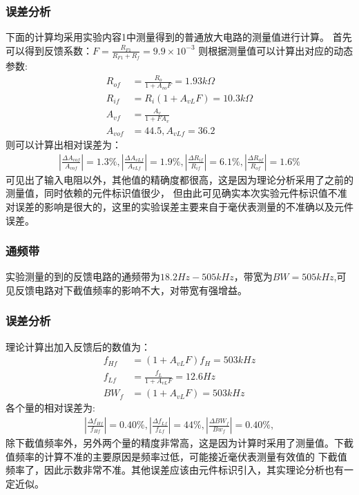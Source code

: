 \documentclass[a4paper,11pt,UTF8]{ctexart}
\begin{document}
  \subsubsection{误差分析}
  下面的计算均采用实验内容1中测量得到的普通放大电路的测量值进行计算。
  首先可以得到反馈系数：$F=\frac{R_{F1}}{R_{F1}+R_f}=9.9\times10^{-3}$
  则根据测量值可以计算出对应的动态参数:
  \begin{equation}
  \begin{aligned}
    R_{of}&=\frac{R_o}{1+A_{vo}F}=1.93k\Omega\\
    R_{if}&=R_i(1+A_{vL}F)=10.3k\Omega\\
    A_{vf}&=\frac{A_v}{1+FA_v}\\
    A_{vof}&=44.5,A_{vLf}=36.2
  \end{aligned}
  \end{equation}
  则可以计算出相对误差为：
  \begin{equation}
    \begin{aligned}
      \left |\frac{\Delta A_{vof}}{A_{vof}}\right |=1.3\%,
      \left |\frac{\Delta A_{vLf}}{A_{vLf}}\right |=1.9\%,
      \left |\frac{\Delta R_{if}}{R_{if}}\right |=6.1\%,
      \left |\frac{\Delta R_{of}}{R_{of}}\right |=1.6\%
    \end{aligned}
  \end{equation}
  可见出了输入电阻以外，其他值的精确度都很高，这是因为理论分析采用了之前的测量值，同时依赖的元件标识值很少，
  但由此可见确实本次实验元件标识值不准对误差的影响是很大的，这里的实验误差主要来自于毫伏表测量的不准确以及元件误差。
  \subsubsection{通频带}
  实验测量的到的反馈电路的通频带为$18.2Hz-505kHz$，带宽为$BW=505kHz$,可见反馈电路对下截值频率的影响不大，对带宽有强增益。
  \subsubsection{误差分析}
  理论计算出加入反馈后的数值为：
  \begin{equation}
  \begin{aligned}
    f_{Hf}&=(1+A_{vL}F)f_H=503kHz\\
    f_{Lf}&=\frac{f_L}{1+A_{vL}F}=12.6Hz\\
    BW_f&=(1+A_{vL}F)=503kHz
  \end{aligned}
  \end{equation}
  各个量的相对误差为:
  \begin{equation}
    \begin{aligned}
      \left |\frac{\Delta f_{Hf}}{f_{Hf}}\right |=0.40\%,
      \left |\frac{\Delta f_{Lf}}{f_{Lf}}\right |=44\%,
      \left |\frac{\Delta BW_{f}}{Bw_{f}}\right |=0.40\%,
    \end{aligned}
  \end{equation}
  除下截值频率外，另外两个量的精度非常高，这是因为计算时采用了测量值。下截值频率的计算不准的主要原因是频率过低，可能接近毫伏表测量有效值的
  下截值频率了，因此示数非常不准。其他误差应该由元件标识引入，其实理论分析也有一定近似。
\end{document}
